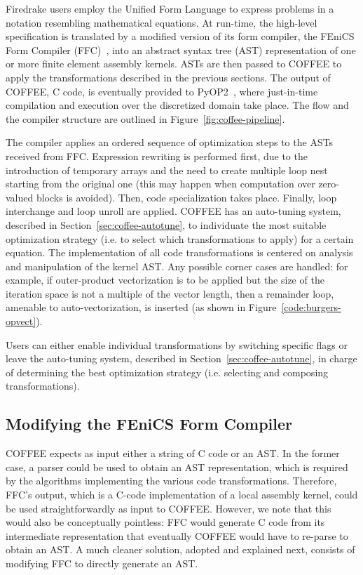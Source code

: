 Firedrake users employ the Unified Form Language to express problems in a notation resembling mathematical equations. At run-time, the high-level specification is translated by a modified version of its form compiler, the FEniCS Form Compiler (FFC)~\cite{FFC-Compiler}, into an abstract syntax tree (AST) representation of one or more finite element assembly kernels. ASTs are then passed to COFFEE to apply the transformations described in the previous sections. The output of COFFEE, C code, is eventually provided to PyOP2~\citep{pyop2isc}, where just-in-time compilation and execution over the discretized domain take place. The flow and the compiler structure are outlined in Figure~\ref{fig:coffee-pipeline}. 

The compiler applies an ordered sequence of optimization steps to the ASTs received from FFC. Expression rewriting is performed first, due to the introduction of temporary arrays and the need to create multiple loop nest starting from the original one (this may happen when computation over zero-valued blocks is avoided). Then, code specialization takes place. Finally, loop interchange and loop unroll are applied. COFFEE has an auto-tuning system, described in Section~\ref{sec:coffee-autotune}, to individuate the most suitable optimization strategy (i.e. to select which transformations to apply) for a certain equation. The implementation of all code transformations is centered on analysis and manipulation of the kernel AST. Any possible corner cases are handled: for example, if outer-product vectorization is to be applied but the size of the iteration space is not a multiple of the vector length, then a remainder loop, amenable to auto-vectorization, is inserted (as shown in Figure~\ref{code:burgers-opvect}).

Users can either enable individual transformations by switching specific flags or leave the auto-tuning system, described in Section~\ref{sec:coffee-autotune}, in charge of determining the best optimization strategy (i.e. selecting and composing transformations).

\subsection{Modifying the FEniCS Form Compiler}
COFFEE expects as input either a string of C code or an AST. In the former case, a parser could be used to obtain an AST representation, which is required by the algorithms implementing the various code transformations. Therefore, FFC's output, which is a C-code implementation of a local assembly kernel, could be used straightforwardly as input to COFFEE. However, we note that this would also be conceptually pointless: FFC would generate C code from its intermediate representation that eventually COFFEE would have to re-parse to obtain an AST. A much cleaner solution, adopted and explained next, consists of modifying FFC to directly generate an AST. 

